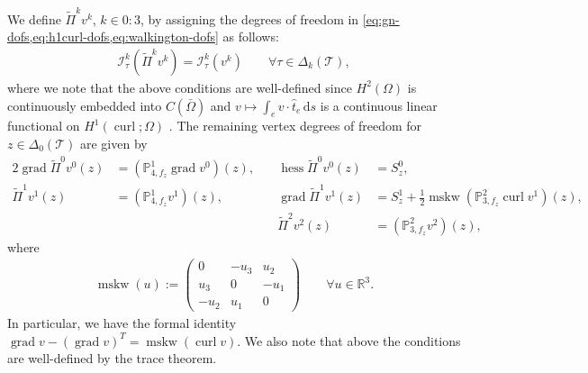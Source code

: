 \documentclass{mcom-l}
\theoremstyle{definition}
\theoremstyle{remark}
\numberwithin{equation}{section}
\newcommand{\unitvec}[1]{\hat{#1}}
\renewcommand{\d}[1]{\,\mathrm{d}{#1}}
\DeclareMathOperator{\curl}{curl}
\DeclareMathOperator{\grad}{grad}
\DeclareMathOperator{\hess}{hess}
\DeclareMathOperator{\mskw}{mskw}
\newcommand{\mesh}[0]{\mathcal{T}}
\begin{document}
We define $\tilde{\Pi}^k v^k$, $k \in 0:3$, by assigning the degrees of freedom
in \cref{eq:gn-dofs,eq:h1curl-dofs,eq:walkington-dofs} as follows:
\begin{align}
	\label{eq:proof:fortin-current-dofs}
	\mathcal{I}_{\tau}^{k}( \tilde{\Pi}^k v^k) = \mathcal{I}_{\tau}^{k}(v^k)
	\qquad \forall \tau \in \Delta_k(\mesh),
\end{align}
where we note that the above conditions are well-defined since 
$H^2(\Omega)$ is continuously embedded into $C(\bar{\Omega})$
and  $v \mapsto \int_{e} v \cdot \unitvec{t}_e \d{s}$
is a continuous linear functional on $H^1(\curl; \Omega)$ 
\cite[pp. 284-285]{Hiptmair02}.
The remaining vertex degrees of freedom for $z \in \Delta_0(\mesh)$ are given by 
\begin{alignat*}{2}
	\grad \tilde{\Pi}^0 v^0(z) &= (\mathbb{P}_{4, f_z}^{1} \grad v^0)(z),
	\quad &
	\hess \tilde{\Pi}^0 v^0(z) &= S_z^{0}, \\
	\tilde{\Pi}^1 v^1(z) &= (\mathbb{P}_{4, f_z}^{1} v^1)(z),
	\quad & 
	\grad \tilde{\Pi}^1 v^1(z) &= S_z^{1} 
	+ \frac{1}{2} \mskw(\mathbb{P}_{3, f_z}^{2} \curl v^1)(z), \\
	& \quad &
	\tilde{\Pi}^2 v^2(z) &= (\mathbb{P}_{3, f_z}^{2} v^2)(z),
\end{alignat*}	
where 
\begin{align*}
	\mskw(u) := \begin{pmatrix}
		0 & -u_3 & u_2 \\
		u_3 & 0 & -u_1 \\
		-u_2 & u_1 & 0
	\end{pmatrix} \qquad \forall u \in \mathbb{R}^3.
\end{align*}
In particular, we have the formal identity 
$\grad v - (\grad v)^T  = \mskw(\curl v)$. We also note that above the 
conditions are well-defined by the trace theorem.
\\
\end{document}
